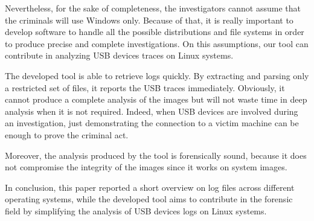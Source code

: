 \documentclass[a4paper]{article}
\begin{document}
Nevertheless, for the sake of completeness, the investigators cannot assume
that the criminals will use Windows only. Because of that, it is really
important to develop software to handle all the possible distributions and file
systems in order to produce precise and complete investigations. On this
assumptions, our tool can contribute in analyzing USB devices traces on Linux
systems.

The developed tool is able to retrieve logs quickly. By extracting and parsing
only a restricted set of files, it reports the USB traces immediately.
Obviously, it cannot produce a complete analysis of the images but will not
waste time in deep analysis when it is not required. Indeed, when USB devices
are involved during an investigation, just demonstrating the connection to a
victim machine can be enough to prove the criminal act.

Moreover, the analysis produced by the tool is forensically sound, because it
does not compromise the integrity of the images since it works on system
images.

In conclusion, this paper reported a short overview on log files across
different operating systems, while the developed tool aims to contribute in the
forensic field by simplifying the analysis of USB devices logs on Linux
systems.



\end{document}

